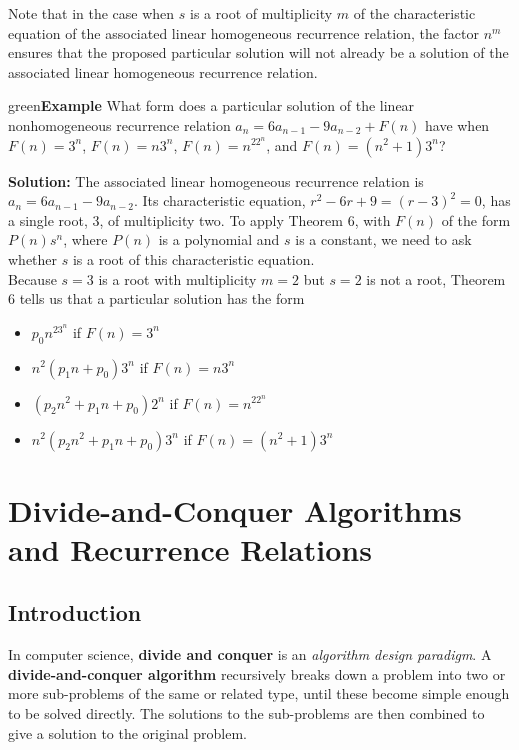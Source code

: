 \documentclass[11pt]{article}
\newenvironment{example}[1][\unskip]{\begin{mybox}{green}{\textbf{Example} {#1}}}{\end{mybox}}
\begin{document}
Note that in the case when $s$ is a root of multiplicity $m$ of the characteristic equation of the associated linear homogeneous recurrence relation, the factor $n^m$ ensures that the proposed particular solution will not already be a solution of the associated linear homogeneous recurrence relation. 

\begin{example}
What form does a particular solution of the linear nonhomogeneous recurrence relation $a_n = 6a_{n-1} - 9a_{n-2} + F(n)$ have when $F(n) = 3^n$, $F(n) = n3^n$, $F(n) = n^22^n$, and $F(n) = (n^2 + 1)3^n$?

\textbf{Solution:}
The associated linear homogeneous recurrence relation is $a_n = 6a_{n-1} - 9a_{n-2}$. Its characteristic equation, $r^2 - 6r + 9 = (r - 3)^2 = 0$, has a single root, 3, of multiplicity two. To apply Theorem 6, with $F(n)$ of the form $P(n)s^n$, where $P(n)$ is a polynomial and $s$ is a constant, we need to ask whether $s$ is a root of this characteristic equation.\\

Because $s = 3$ is a root with multiplicity $m = 2$ but $s = 2$ is not a root, Theorem 6 tells us that a particular solution has the form
\begin{itemize}
    \item $p_0n^23^n$ if $F(n) = 3^n$
    \item $n^2(p_1n + p_0)3^n$ if $F(n) = n3^n$
    \item $(p_2n^2 + p_1n + p_0)2^n$ if $F(n) = n^22^n$
    \item $n^2(p_2n^2 + p_1n + p_0)3^n$ if $F(n) = (n^2 + 1)3^n$
\end{itemize}
\end{example}


\section{Divide-and-Conquer Algorithms and Recurrence Relations}

\subsection{Introduction}

In computer science, \textbf{divide and conquer} is an \textit{algorithm design paradigm}. A \textbf{divide-and-conquer algorithm} recursively breaks down a problem into two or more sub-problems of the same or related type, until these become simple enough to be solved directly. The solutions to the sub-problems are then combined to give a solution to the original problem. 
\end{document}
